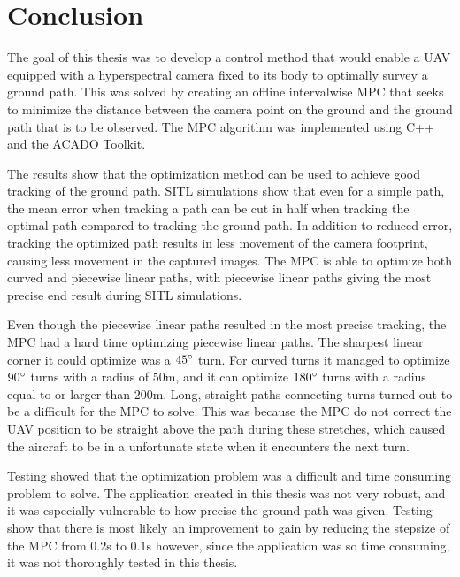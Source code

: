 \chapter{Conclusion}

The goal of this thesis was to develop a control method that would enable a UAV equipped with a hyperspectral camera fixed to its body to optimally survey a ground path. This was solved by creating an offline intervalwise MPC that seeks to minimize the distance between the camera point on the ground and the ground path that is to be observed. The MPC algorithm was implemented using C++ and the ACADO Toolkit.

The results show that the optimization method can be used to achieve good tracking of the ground path. SITL simulations show that even for a simple path, the mean error when tracking a path can be cut in half when tracking the optimal path compared to tracking the ground path. In addition to reduced error, tracking the optimized path results in less movement of the camera footprint, causing less movement in the captured images. The MPC is able to optimize both curved and piecewise linear paths, with piecewise linear paths giving the most precise end result during SITL simulations.

Even though the piecewise linear paths resulted in the most precise tracking, the MPC had a hard time optimizing piecewise linear paths. The sharpest linear corner it could optimize was a $45\degree$ turn. For curved turns it managed to optimize $90\degree$ turns with a radius of $50$m, and it can optimize $180\degree$ turns with a radius equal to or larger than $200$m. Long, straight paths connecting turns turned out to be a difficult for the MPC to solve. This was because the MPC do not correct the UAV position to be straight above the path during these stretches, which caused the aircraft to be in a unfortunate state when it encounters the next turn.

Testing showed that the optimization problem was a difficult and time consuming problem to solve. The application created in this thesis was not very robust, and it was especially vulnerable to how precise the ground path was given. Testing show that there is most likely an improvement to gain by reducing the stepsize of the MPC from $0.2$s to $0.1$s however, since the application was so time consuming, it was not thoroughly tested in this thesis.


